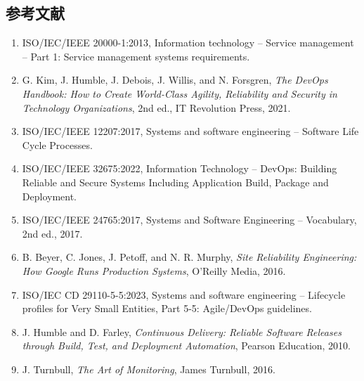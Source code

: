 \subsection{参考文献}

\begin{enumerate}[label={\arabic*.}]
  \item ISO/IEC/IEEE 20000-1:2013, Information technology -- Service management -- Part 1: Service management systems requirements.
  \item G. Kim, J. Humble, J. Debois, J. Willis, and N. Forsgren, \textit{The DevOps Handbook: How to Create World-Class Agility, Reliability and Security in Technology Organizations}, 2nd ed., IT Revolution Press, 2021.
  \item ISO/IEC/IEEE 12207:2017, Systems and software engineering -- Software Life Cycle Processes.
  \item ISO/IEC/IEEE 32675:2022, Information Technology -- DevOps: Building Reliable and Secure Systems Including Application Build, Package and Deployment.
  \item ISO/IEC/IEEE 24765:2017, Systems and Software Engineering -- Vocabulary, 2nd ed., 2017.
  \item B. Beyer, C. Jones, J. Petoff, and N. R. Murphy, \textit{Site Reliability Engineering: How Google Runs Production Systems}, O'Reilly Media, 2016.
  \item ISO/IEC CD 29110-5-5:2023, Systems and software engineering -- Lifecycle profiles for Very Small Entities, Part 5-5: Agile/DevOps guidelines.
  \item J. Humble and D. Farley, \textit{Continuous Delivery: Reliable Software Releases through Build, Test, and Deployment Automation}, Pearson Education, 2010.
  \item J. Turnbull, \textit{The Art of Monitoring}, James Turnbull, 2016.
\end{enumerate}

